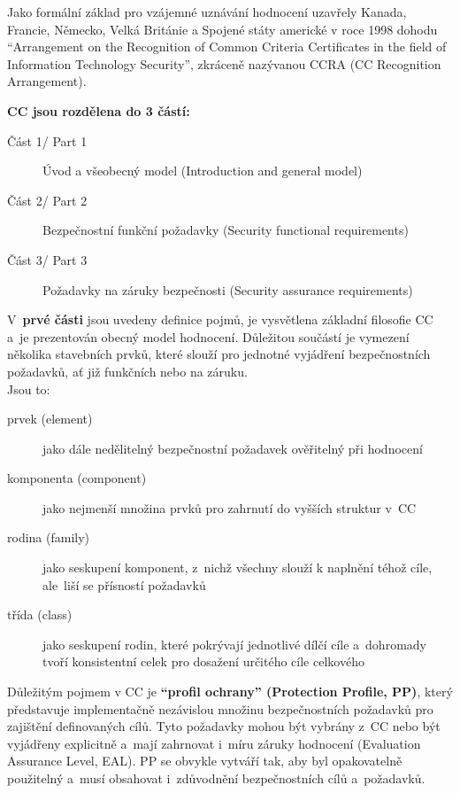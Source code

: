 \documentclass[a4paper,12pt]{article}
\renewcommand{\b}[1]{\textbf{#1}} %
\begin{document}
Jako formální základ pro vzájemné uznávání hodnocení uzavřely Kanada, Francie, Německo, Velká Británie a Spojené státy americké v roce 1998 dohodu “Arrangement on the Recognition of
Common Criteria Certificates in the field of Information Technology Security”, zkráceně nazývanou CCRA (CC Recognition Arrangement).~\cite{NBUHodnoceniBezpecnostiSW}

\b{CC jsou rozdělena do 3 částí:}
\begin{description}
 \item[Část 1/ Part 1] Úvod a všeobecný model (Introduction and general model)
 \item[Část 2/ Part 2] Bezpečnostní funkční požadavky (Security functional requirements)
 \item[Část 3/ Part 3] Požadavky na záruky bezpečnosti (Security assurance requirements)
 \end{description}

V~\b{prvé části} jsou uvedeny definice pojmů, je vysvětlena základní filosofie CC a~je prezentován obecný model hodnocení. Důležitou součástí je vymezení několika stavebních prvků, které slouží pro jednotné vyjádření bezpečnostních požadavků, ať již funkčních nebo na záruku.~\cite{NBUHodnoceniBezpecnostiSW}\\

Jsou to:
\begin{description}
 \item[prvek (element)] jako dále nedělitelný bezpečnostní požadavek ověřitelný při hodnocení
 \item[komponenta (component)] jako nejmenší množina prvků pro zahrnutí do vyšších struktur v~CC
 \item[rodina (family)] jako seskupení komponent, z~nichž všechny slouží k naplnění téhož cíle, ale~liší se přísností požadavků
 \item[třída (class)]jako seskupení rodin, které pokrývají jednotlivé dílčí cíle a~dohromady tvoří konsistentní celek pro dosažení určitého cíle celkového
 \end{description}

Důležitým pojmem v CC je \b{“profil ochrany” (Protection Profile, PP)}, který představuje implementačně nezávislou množinu bezpečnostních požadavků pro zajištění definovaných cílů. Tyto požadavky mohou být vybrány z~CC nebo být vyjádřeny explicitně a~mají zahrnovat i~míru záruky hodnocení (Evaluation Assurance Level, EAL). PP se obvykle vytváří tak, aby byl opakovatelně použitelný a~musí obsahovat i~zdůvodnění bezpečnostních cílů a~požadavků.~\cite{NBUHodnoceniBezpecnostiSW}
\end{document}
